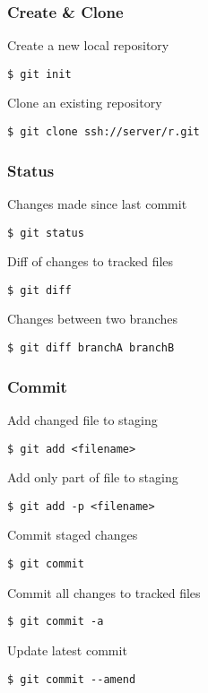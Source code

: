 

%


\titlespacing*{\subsubsection}{0pt}{6pt}{2pt}

\begin{multicols}{2}
\subsubsection*{Create \& Clone}
Create a new local repository
\begin{lstlisting}
$ git init
\end{lstlisting}
Clone an existing repository
\begin{lstlisting}
$ git clone ssh://server/r.git
\end{lstlisting}

\subsubsection*{Status}
Changes made since last commit
\begin{lstlisting}
$ git status
\end{lstlisting}
Diff of changes to tracked files
\begin{lstlisting}
$ git diff
\end{lstlisting}
Changes between two branches
\begin{lstlisting}
$ git diff branchA branchB
\end{lstlisting}

\subsubsection*{Commit}
Add changed file to staging
\begin{lstlisting}
$ git add <filename>
\end{lstlisting}
Add only part of file to staging
\begin{lstlisting}
$ git add -p <filename>
\end{lstlisting}
Commit staged changes
\begin{lstlisting}
$ git commit
\end{lstlisting}
Commit all changes to tracked files
\begin{lstlisting}
$ git commit -a
\end{lstlisting}
Update latest commit
\begin{lstlisting}
$ git commit --amend
\end{lstlisting}


\end{multicols}
